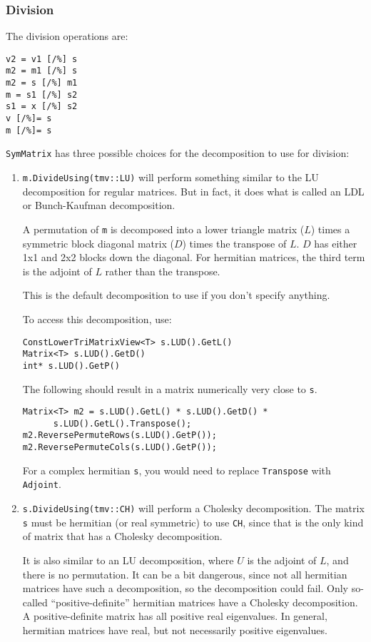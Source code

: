 \documentclass[twoside,letterpaper,11pt]{article}
\renewcommand{\tt}[1]{{\texttt {#1}}}
\begin{document}
\subsubsection{Division}
The division operations are:
\begin{verbatim}
v2 = v1 [/%] s
m2 = m1 [/%] s
m2 = s [/%] m1
m = s1 [/%] s2
s1 = x [/%] s2
v [/%]= s
m [/%]= s
\end{verbatim}

\tt{SymMatrix} has three possible choices for the decomposition to use for division:
\begin{enumerate}
\item
\tt{m.DivideUsing(tmv::LU)} will perform something similar to the LU decomposition
for regular matrices.  But in fact, it does what is called an LDL or Bunch-Kaufman
decomposition.  

A permutation of \tt{m} is decomposed into a lower triangle matrix ($L$)
times a symmetric block diagonal matrix ($D$) times the transpose of $L$.
$D$ has either 1x1 and 2x2 blocks down the diagonal.  For hermitian matrices,
the third term is the adjoint of $L$ rather than the transpose.

This is the default decomposition to use if you don't specify anything.

To access this decomposition, use:
\begin{verbatim}
ConstLowerTriMatrixView<T> s.LUD().GetL()
Matrix<T> s.LUD().GetD()
int* s.LUD().GetP()
\end{verbatim}
The following should result in a matrix numerically very close to \tt{s}.
\begin{verbatim}
Matrix<T> m2 = s.LUD().GetL() * s.LUD().GetD() * 
      s.LUD().GetL().Transpose();
m2.ReversePermuteRows(s.LUD().GetP());
m2.ReversePermuteCols(s.LUD().GetP());
\end{verbatim}
For a complex hermitian \tt{s}, you would need to replace
\tt{Transpose} with \tt{Adjoint}.

\item
\tt{s.DivideUsing(tmv::CH)} will perform a Cholesky decomposition.  
The matrix \tt{s} must be hermitian (or real symmetric) to use \tt{CH}, since that is the
only kind of matrix that has a Cholesky decomposition.  

It is also similar to an 
LU decomposition, where $U$ is the adjoint of $L$, and there is no permutation.
It can be a bit dangerous, since not all hermitian matrices have such a decomposition,
so the decomposition could fail.  Only so-called ``positive-definite'' hermitian 
matrices have a Cholesky decomposition.  A positive-definite matrix has
all positive real eigenvalues.  In general, hermitian matrices have real, but
not necessarily positive eigenvalues.  


\end{enumerate}
\end{document}
